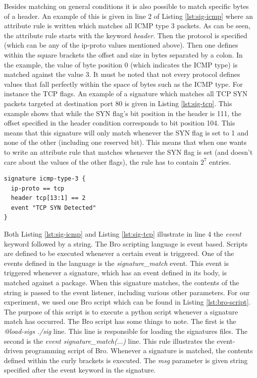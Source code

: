 Besides matching on general conditions it is also possible to match specific bytes of a header. An example of this is given in line 2 of Listing \ref{lst:sig-icmp} where an attribute rule is written which matches all ICMP type 3 packets. As can be seen, the attribute rule starts with the keyword \emph{header}. Then the protocol is specified (which can be any of the ip-proto values mentioned above). Then one defines within the square brackets the offset and size in bytes separated by a colon. In the example, the value of byte position 0  (which indicates the ICMP type) is matched against the value 3. It must be noted that not every protocol defines values that fall perfectly within the space of bytes such as the ICMP type. For instance the TCP flags. An example of a signature which matches all TCP SYN packets targeted at destination port 80 is given in Listing \ref{lst:sig-tcp}. This example shows that while the SYN flag's bit position in the header is 111, the offset specified in the header condition corresponds to bit position 104. This means that this signature will only match whenever the SYN flag is set to 1 and none of the other (including one reserved bit). This means that when one wants to write an attribute rule that matches whenever the SYN flag is set (and doesn't care about the values of the other flags), the rule has to contain $2^7$ entries. 


\begin{lstlisting}[caption={Bro signature which matches all TCP SYN packets targeted at port 80}, label={lst:sig-tcp}]
signature icmp-type-3 {
  ip-proto == tcp  
  header tcp[13:1] == 2
  event "TCP SYN Detected"
}
\end{lstlisting} 

Both Listing \ref{lst:sig-icmp} and Listing \ref{lst:sig-tcp} illustrate in line 4 the \emph{event} keyword followed by a string. The Bro scripting language is event based. Scripts are defined to be executed whenever a certain event is triggered. One of the events defined in the language is the \emph{signature\_match} event. This event is triggered whenever a signature, which has an event defined in its body, is matched against a package. When this signature matches, the contents of the string is passed to the event listener, including various other parameters. For our experiment, we used one Bro script which can be found in Listing \ref{lst:bro-script}. The purpose of this script is to execute a python script whenever a signature match has occurred. The Bro script has some things to note. The first is the \emph{@load-sigs ./sig} line. This line is responsible for loading the signatures files. The second is the \emph{event signature\_match($\dots$)} line. This rule illustrates the event-driven programming script of Bro. Whenever a signature is matched, the contents defined within the curly brackets is executed. The \emph{msg} parameter is given string specified after the event keyword in the signature.  

